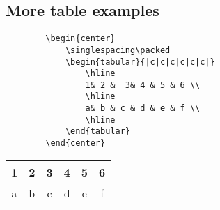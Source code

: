 \bigskip
\subsection{More table examples} \label{app:more-table-examples}

\begin{SBN}
	\begin{verbatim}
		\begin{center}
			\singlespacing\packed
			\begin{tabular}{|c|c|c|c|c|c|}
				\hline
				1& 2 &  3& 4 & 5 & 6 \\
				\hline
				a& b & c & d & e & f \\
				\hline
			\end{tabular}
		\end{center}
	\end{verbatim}
\end{SBN}
\medskip
\begin{center}
	\singlespacing\packed
	\begin{tabular}{|c|c|c|c|c|c|}
		\hline
		1& 2 &  3& 4 & 5 & 6 \\
		\hline
		a& b & c & d & e & f \\
		\hline
	\end{tabular}
\end{center}


\begin{comment}
	This is an example of a table, we refer to as \Table{tab:1}.
	\begin{SBN}
		\begin{verbatim}
			\begin{singlespace}
				\begin{table}[!th]
					\centering  
					\begin{tabular}{|c|c|}
						\hline
						{Use in Netlist}   & {Description} \\ \hline
						\textbf{fs}        & femtosecond   \\ \hline
						\textbf{ps}        & picosecond    \\ \hline
					\end{tabular}
					\caption{Sample table.}
					\label{tab:1}
				\end{table}
			\end{singlespace}
		\end{verbatim}
	\end{SBN}
	
	\medskip
	\begin{singlespace}
		\begin{table}[!th]
			\centering  
			\begin{tabular}{|c|c|}
				\hline
				{Use in Netlist}   & {Description} \\ \hline
				\textbf{fs}        & femtosecond   \\ \hline
				\textbf{ps}        & picosecond    \\ \hline
			\end{tabular}
			\caption{Sample table.}
			\label{tab:1}
		\end{table}
	\end{singlespace}
\end{comment}

